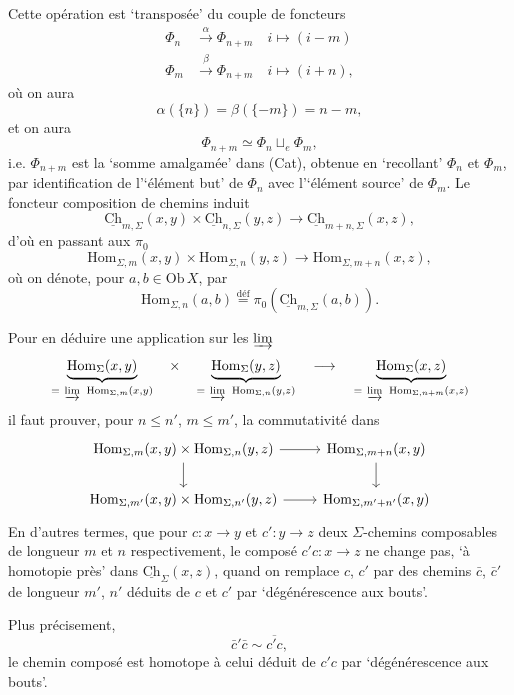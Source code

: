 \documentclass[11pt]{article}
\newcommand{\printedpage}[1]{\marginpar{\footnotesize p.~#1}}
\newcommand{\msp}[1]{\marginpar{\footnotesize [#1]}}
\newcommand{\Hom}{\mathrm{Hom}}
\newcommand{\uCh}{\underline{\mathrm{Ch}}}
\begin{document}
\msp{page 9}
Cette opération est `transposée' du couple de foncteurs
\[
\begin{aligned}
\Phi_n &\xrightarrow{\alpha} \Phi_{n+m}\quad i\longmapsto (i-m)\\
\Phi_m &\xrightarrow{\beta} \Phi_{n+m}\quad i\longmapsto (i+n),
\end{aligned}
\]
\printedpage{7}
où on aura
\[
\alpha(\{n\})=\beta(\{-m\})=n-m,
\]
et on aura
\[
\Phi_{n+m}\simeq\Phi_n\sqcup_e\Phi_m,
\]
i.e. $\Phi_{n+m}$ est la `somme amalgamée' dans (Cat), obtenue en `recollant' $\Phi_n$ et $\Phi_m$, par identification de l'`élément but' de $\Phi_n$ avec l'`élément source' de $\Phi_m$. Le foncteur composition de chemins induit 
\[
\uCh_{m,\Sigma}(x,y)\times\uCh_{n,\Sigma}(y,z)\longrightarrow\uCh_{m+n,\Sigma}(x,z),
\]
d'où en passant aux $\pi_0$
\[
\Hom_{\Sigma,m}(x,y)\times\Hom_{\Sigma,n}(y,z)\longrightarrow\Hom_{\Sigma,m+n}(x,z),
\]
où on dénote, pour $a,b\in\mathrm{Ob}\,X$, par
\[
\Hom_{\Sigma,n}(a,b)\overset{\text{déf}}{=}\pi_0(\uCh_{m,\Sigma}(a,b)).
\]



\msp{page 10}
Pour en déduire une application sur les $\varinjlim$
\[
\underbrace{\Hom_\Sigma(x,y)}_{=\ \varinjlim\ \Hom_{\Sigma,m}(x,y)}\quad\times\quad\underbrace{\Hom_\Sigma(y,z)}_{=\ \varinjlim\ \Hom_{\Sigma,n}(y,z)}\quad\longrightarrow\quad\underbrace{\Hom_\Sigma(x,z)}_{=\ \varinjlim\ \Hom_{\Sigma,n+m}(x,z)}
\]
il faut prouver, pour $n\leq n'$, $m\leq m'$, la commutativité dans
\[
\begin{tikzcd}
\Hom_{\Sigma,m}(x,y)\times\Hom_{\Sigma,n}(y,z) \arrow[r] \arrow[d] & \Hom_{\Sigma,m+n}(x,y) \arrow[d] \\
\Hom_{\Sigma,m'}(x,y)\times\Hom_{\Sigma,n'}(y,z) \arrow[r] & \Hom_{\Sigma,m'+n'}(x,y)
\end{tikzcd}
\]
 En d'autres termes, que pour $c:x\longrightarrow y$ et $c':y\longrightarrow z$ deux $\Sigma$-chemins composables de longueur $m$ et $n$ respectivement, le composé $c'c:x\longrightarrow z$ ne change pas, `à homotopie près' dans $\uCh_\Sigma(x,z)$, quand on remplace $c$, $c'$ par des chemins $\bar{c}$, $\bar{c}'$ de longueur $m'$, $n'$ déduits de $c$ et $c'$ par `dégénérescence aux bouts'.

Plus précisement, %
\[
\bar{c}'\bar{c}\sim\overline{c'c},
\]
le chemin composé est homotope à celui déduit de $c'c$ par `dégénérescence aux bouts'.
\end{document}
